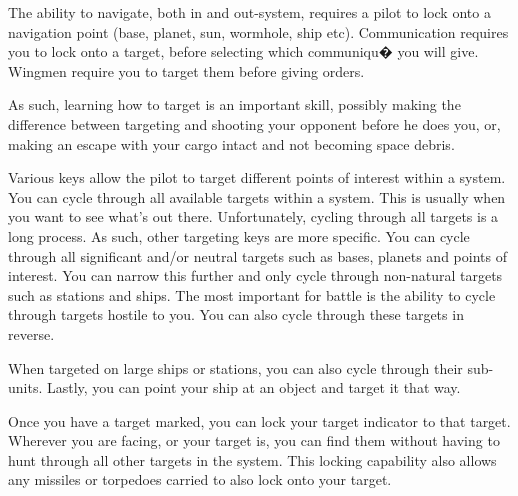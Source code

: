 \documentclass{article}
\begin{document}
The ability to navigate, both in and out-system, requires a pilot to lock onto a navigation point (base, planet, sun, wormhole, ship etc). Communication requires you to lock onto a target, before selecting which communiqu� you will give. Wingmen require you to target them before giving orders. 

As such, learning how to target is an important skill, possibly making the difference between targeting and shooting your opponent before he does you, or, making an escape with your cargo intact and not becoming space debris. 

Various keys allow the pilot to target different points of interest within a system. You can cycle through all available targets within a system. This is usually when you want to see what's out there. Unfortunately, cycling through all targets is a long process. As such, other targeting keys are more specific. You can cycle through all significant and/or neutral targets such as bases, planets and points of interest. You can narrow this further and only cycle through non-natural targets such as stations and ships. The most important for battle is the ability to cycle through targets hostile to you. You can also cycle through these targets in reverse. 

When targeted on large ships or stations, you can also cycle through their sub-units. Lastly, you can point your ship at an object and target it that way. 

Once you have a target marked, you can lock your target indicator to that target. Wherever you are facing, or your target is, you can find them without having to hunt through all other targets in the system. This locking capability also allows any missiles or torpedoes carried to also lock onto your target. 
\end{document}
